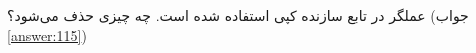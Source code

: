 \section{}
\paragraph{}\label{hint:188}
عملگر  در تابع سازنده کپی استفاده شده است. چه چیزی حذف می‌شود؟ (جواب \ref{answer:115})
